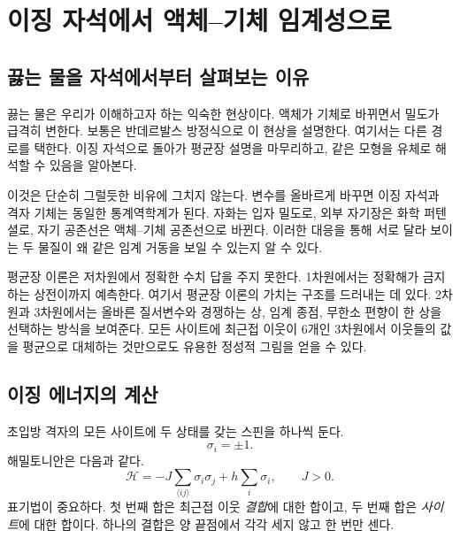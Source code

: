 \chapter{이징 자석에서 액체--기체 임계성으로}


\section{끓는 물을 자석에서부터 살펴보는 이유}

끓는 물은 우리가 이해하고자 하는 익숙한 현상이다. 액체가 기체로 바뀌면서 밀도가 급격히 변한다. 보통은 반데르발스 방정식으로 이 현상을 설명한다. 여기서는 다른 경로를 택한다. 이징 자석으로 돌아가 평균장 설명을 마무리하고, 같은 모형을 유체로 해석할 수 있음을 알아본다.

이것은 단순히 그럴듯한 비유에 그치지 않는다. 변수를 올바르게 바꾸면 이징 자석과 격자 기체는 동일한 통계역학계가 된다. 자화는 입자 밀도로, 외부 자기장은 화학 퍼텐셜로, 자기 공존선은 액체--기체 공존선으로 바뀐다. 이러한 대응을 통해 서로 달라 보이는 두 물질이 왜 같은 임계 거동을 보일 수 있는지 알 수 있다.

평균장 이론은 저차원에서 정확한 수치 답을 주지 못한다. 1차원에서는 정확해가 금지하는 상전이까지 예측한다. 여기서 평균장 이론의 가치는 구조를 드러내는 데 있다. 2차원과 3차원에서는 올바른 질서변수와 경쟁하는 상, 임계 종점, 무한소 편향이 한 상을 선택하는 방식을 보여준다. 모든 사이트에 최근접 이웃이 6개인 3차원에서 이웃들의 값을 평균으로 대체하는 것만으로도 유용한 정성적 그림을 얻을 수 있다.

\section{이징 에너지의 계산}

초입방 격자의 모든 사이트에 두 상태를 갖는 스핀을 하나씩 둔다.
\begin{equation}
\sigma_i=\pm1.
\end{equation}
해밀토니안은 다음과 같다.
\begin{equation}
\mathcal H
=-J\sum_{\langle ij\rangle}\sigma_i\sigma_j
+h\sum_i\sigma_i,
\qquad J>0.
\label{eq:ising-hamiltonian}
\end{equation}
표기법이 중요하다. 첫 번째 합은 최근접 이웃 \emph{결합}에 대한 합이고, 두 번째 합은 \emph{사이트}에 대한 합이다. 하나의 결합은 양 끝점에서 각각 세지 않고 한 번만 센다.

